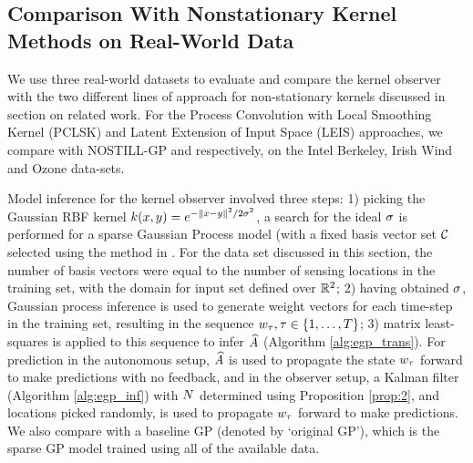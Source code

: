 \subsection{Comparison With Nonstationary Kernel Methods on Real-World Data}\label{sec:comparison}
We use three real-world datasets to evaluate and compare the kernel observer with the two different lines of approach for non-stationary kernels  discussed in section on related work. %
For the Process Convolution with Local Smoothing Kernel (PCLSK) and Latent Extension of Input Space (LEIS) approaches, we compare with NOSTILL-GP \cite{garg2012AAAI} and \cite{pfingsten2006nonstationary} respectively, on the Intel Berkeley, Irish Wind and Ozone data-sets. 

Model inference for the kernel observer involved three steps: 1) picking the Gaussian RBF kernel $k(x,y) = e^{-\|x-y\|^2/2\sigma^2}$, a search for the ideal $\sigma$ is performed for a sparse Gaussian Process model (with a fixed basis vector set $\mathcal{C}$ selected using the method in \cite{csato2002sparse}. %
{For the data set discussed in this section, the number of basis vectors were equal to the number of sensing locations in the training set, with the domain for input set defined over $ \mathbb{R}^2 $}; 2) having obtained $\sigma$, Gaussian process inference is used to generate weight vectors for each time-step in the training set, resulting in the sequence $w_\tau, \tau\in\{1,\dots,T\}$; 3) matrix least-squares is applied to this sequence to infer $\widehat{A}$ (Algorithm \ref{alg:egp_trans}). For prediction in the autonomous setup, $\widehat{A}$ is used to propagate the state $w_{\tau}$ forward to make predictions with no feedback, and in the observer setup, a Kalman filter (Algorithm \ref{alg:egp_inf}) with $N$ determined using Proposition \ref{prop:2}, and locations picked randomly, is used to propagate $w_{\tau}$ forward to make predictions. We also compare with a baseline GP (denoted by `original GP'), which is the sparse GP model trained using all of the available data. 

